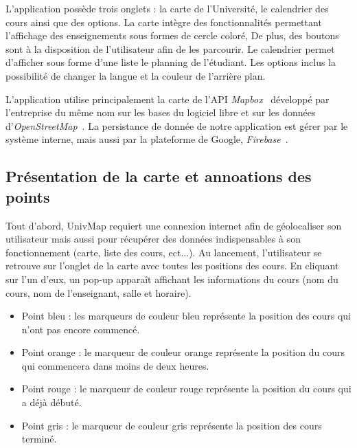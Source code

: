 \documentclass{article}
\begin{document}
L'application possède trois onglets : la carte de l'Université, le calendrier des cours ainsi que des options.
La carte intègre des fonctionnalités permettant l'affichage des enseignements sous formes de cercle coloré, De plus,
des boutons sont à la disposition de l'utilisateur afin de les parcourir.
Le calendrier permet d'afficher sous forme d'une liste le planning de l'étudiant.
Les options inclus la possibilité de changer la langue et la couleur de l'arrière plan.

L'application utilise principalement la carte de l'API \textit{Mapbox}~\cite{mapboxDoc} développé par l'entreprise
du même nom sur les bases du logiciel libre et sur les données d'\textit{OpenStreetMap}~\cite{openstreetmapDoc}.
La persistance de donnée de notre application est gérer par le système interne, mais aussi par la plateforme
de Google, \textit{Firebase}~\cite{firebaseDoc}.



\newpage %



\subsection{Présentation de la carte et annoations des points}

Tout d'abord, UnivMap requiert une connexion internet afin de géolocaliser son utilisateur mais aussi
pour récupérer des données indispensables à son fonctionnement (carte, liste des cours, ect...). Au lancement,
l'utilisateur se retrouve sur l'onglet de la carte avec toutes les positions des cours. En cliquant sur l'un d'eux,
un pop-up apparaît affichant les informations du cours (nom du cours, nom de l'enseignant, salle et horaire).\\

\begin{itemize}
    \item Point bleu : les marqueurs de couleur bleu représente la position des cours qui n'ont pas encore commencé.

    \item Point orange : le marqueur de couleur orange représente la position du cours qui commencera dans
    moins de deux heures.

    \item Point rouge : le marqueur de couleur rouge représente la position du cours qui a déjà débuté.

    \item Point gris : le marqueur de couleur gris représente la position des cours terminé.
\end{itemize}
\end{document}
